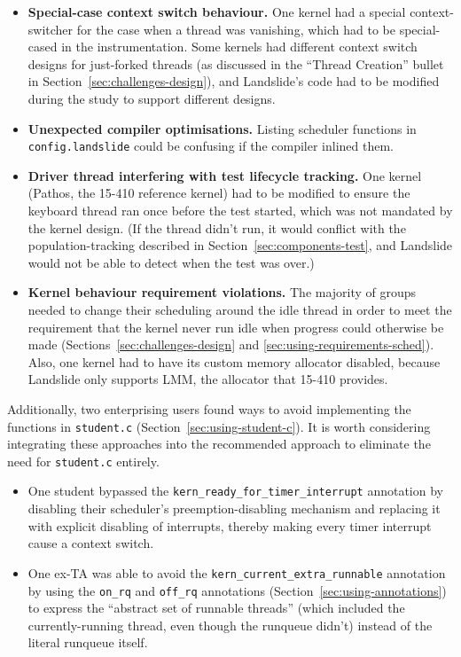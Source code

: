 \begin{itemize}
	\item {\bf Special-case context switch behaviour.} One kernel had a special context-switcher for the case when a thread was vanishing, which had to be special-cased in the instrumentation.
		Some kernels had different context switch designs for just-forked threads (as discussed in the ``Thread Creation'' bullet in Section~\ref{sec:challenges-design}), and Landslide's code had to be modified during the study to support different designs.
	\item {\bf Unexpected compiler optimisations.} Listing scheduler functions in \texttt{config.landslide} could be confusing if the compiler inlined them.
	\item {\bf Driver thread interfering with test lifecycle tracking.} One kernel (Pathos, the 15-410 reference kernel) had to be modified to ensure the keyboard thread ran once before the test started, which was not mandated by the kernel design. (If the thread didn't run, it would conflict with the population-tracking described in Section~\ref{sec:components-test}, and Landslide would not be able to detect when the test was over.)
	\item {\bf Kernel behaviour requirement violations.}
		The majority of groups needed to change their scheduling around the idle thread in order to meet the requirement that the kernel never run idle when progress could otherwise be made (Sections~\ref{sec:challenges-design} and \ref{sec:using-requirements-sched}).
		Also, one kernel had to have its custom memory allocator disabled, because Landslide only supports LMM, the allocator that 15-410 provides.
\end{itemize}

Additionally, two enterprising users found ways to avoid implementing the functions in \texttt{student.c} (Section~\ref{sec:using-student-c}). It is worth considering integrating these approaches into the recommended approach to eliminate the need for \texttt{student.c} entirely.
\begin{itemize}
	\item One student bypassed the \texttt{kern\_ready\_for\_timer\_interrupt} annotation by disabling their scheduler's preemption-disabling mechanism and replacing it with explicit disabling of interrupts, thereby making every timer interrupt cause a context switch.
	\item One ex-TA was able to avoid the \texttt{kern\_current\_extra\_runnable} annotation by using the \texttt{on\_rq} and \texttt{off\_rq} annotations (Section~\ref{sec:using-annotations}) to express the ``abstract set of runnable threads'' (which included the currently-running thread, even though the runqueue didn't) instead of the literal runqueue itself.
\end{itemize}

